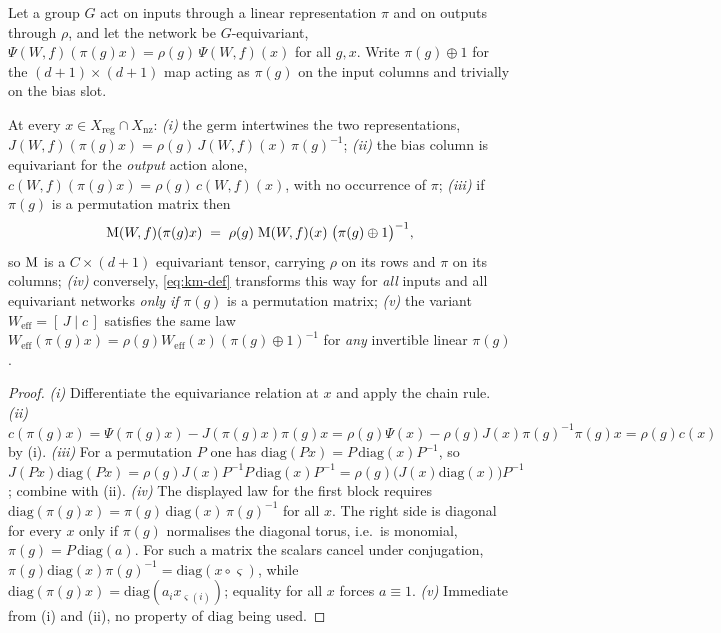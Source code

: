 Let a group $G$ act on inputs through a linear representation $\pi$ and on
outputs through $\rho$, and let the network be $G$-equivariant,
$\Psi(W\!,f)(\pi(g)x)=\rho(g)\,\Psi(W\!,f)(x)$ for all $g,x$. Write
$\pi(g)\oplus1$ for the $(d{+}1)\times(d{+}1)$ map acting as $\pi(g)$ on the
input columns and trivially on the bias slot.

\begin{proposition}\label{prop:equivar}
At every $x\in X_{\mathrm{reg}}\cap X_{\mathrm{nz}}$:
\emph{(i)} the germ intertwines the two representations,
$J(W\!,f)(\pi(g)x)=\rho(g)\,J(W\!,f)(x)\,\pi(g)^{-1}$;
\emph{(ii)} the bias column is equivariant for the \emph{output} action alone,
$c(W\!,f)(\pi(g)x)=\rho(g)\,c(W\!,f)(x)$, with no occurrence of $\pi$;
\emph{(iii)} if $\pi(g)$ is a permutation matrix then
\[
\mathrm{M}(W\!,f)(\pi(g)x)\;=\;\rho(g)\;\mathrm{M}(W\!,f)(x)\;\bigl(\pi(g)\oplus1\bigr)^{-1},
\]
so $\mathrm{M}$ is a $C\times(d{+}1)$ equivariant tensor, carrying $\rho$ on its rows and
$\pi$ on its columns;
\emph{(iv)} conversely, \eqref{eq:km-def} transforms this way for \emph{all}
inputs and all equivariant networks \emph{only if} $\pi(g)$ is a permutation
matrix;
\emph{(v)} the variant $W_{\mathrm{eff}}=[\,J\mid c\,]$ satisfies the same law
$W_{\mathrm{eff}}(\pi(g)x)=\rho(g)W_{\mathrm{eff}}(x)(\pi(g)\oplus1)^{-1}$ for
\emph{any} invertible linear $\pi(g)$.
\end{proposition}

\begin{proof}
\emph{(i)} Differentiate the equivariance relation at $x$ and apply the chain
rule. \emph{(ii)} $c(\pi(g)x)=\Psi(\pi(g)x)-J(\pi(g)x)\pi(g)x
=\rho(g)\Psi(x)-\rho(g)J(x)\pi(g)^{-1}\pi(g)x=\rho(g)c(x)$ by (i).
\emph{(iii)} For a permutation $P$ one has $\mathrm{diag}(Px)=P\,\mathrm{diag}(x)P^{-1}$,
so $J(Px)\mathrm{diag}(Px)=\rho(g)J(x)P^{-1}P\,\mathrm{diag}(x)P^{-1}
=\rho(g)\bigl(J(x)\mathrm{diag}(x)\bigr)P^{-1}$; combine with (ii).
\emph{(iv)} The displayed law for the first block requires
$\mathrm{diag}(\pi(g)x)=\pi(g)\,\mathrm{diag}(x)\,\pi(g)^{-1}$ for all $x$. The
right side is diagonal for every $x$ only if $\pi(g)$ normalises the diagonal
torus, i.e.\ is monomial, $\pi(g)=P\,\mathrm{diag}(a)$. For such a matrix the
scalars cancel under conjugation, $\pi(g)\mathrm{diag}(x)\pi(g)^{-1}
=\mathrm{diag}(x\circ\varsigma)$, while
$\mathrm{diag}(\pi(g)x)=\mathrm{diag}(a_i x_{\varsigma(i)})$; equality for all
$x$ forces $a\equiv1$. \emph{(v)} Immediate from (i) and (ii), no property of
$\mathrm{diag}$ being used. \qedhere
\end{proof}

